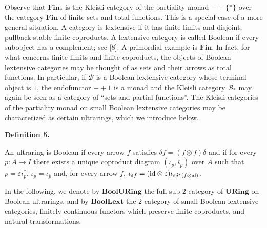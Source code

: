  
 
Observe that $\mathbf{Fin}_{\ast}$ is the Kleisli category of the partiality monad $-+\{\ast\}$ over the category $\mathbf{Fin}$ of finite sets and total functions. This is a special case of a more general situation. A category is lextensive if it has finite limits and disjoint, pullback-stable finite coproducts. A lextensive category is called Boolean if every subobject has a complement; see [8]. A primordial example is $\mathbf{Fin}$. In fact, for what concerns finite limits and finite coproducts, the objects of Boolean lextensive categories may be thought of as sets and their arrows as total functions. In particular, if $\mathcal{B}$ is a Boolean lextensive category whose terminal object is $1$, the endofunctor $-+1$ is a monad and the Kleisli category $\mathcal{B}_{\ast}$ may again be seen as a category of “sets and partial functions”. The Kleisli categories of the partiality monad on small Boolean lextensive categories may be characterized as certain ultrarings, which we introduce below.\par
 
 
 
\par\medskip\noindent\textbf{Definition 5.}\par
 
 
An ultraring is Boolean if every arrow $f$ satisfies $\delta f=(f\otimes f)\delta$ and if for every $p:A\to I$ there exists a unique coproduct diagram $(\iota_{p},\overline{\iota}_{p})$ over $A$ such that $p=\varepsilon\iota_{p}^{\ast}$, $\overline{\iota}_{p}=\iota_{\overline{p}}$ and, for every arrow $f$, $\iota_{\varepsilon f}=(\mathrm{id}\otimes\varepsilon)\iota_{\varepsilon\delta^%
{\ast}(f\otimes\mathrm{id})}$.\par
 
 
 
 
In the following, we denote by $\mathbf{BoolURing}$ the full sub-$2$-category of $\mathbf{URing}$ on Boolean ultrarings, and by $\mathbf{BoolLext}$ the $2$-category of small Boolean lextensive categories, finitely continuous functors which preserve finite coproducts, and natural transformations.\par
 
